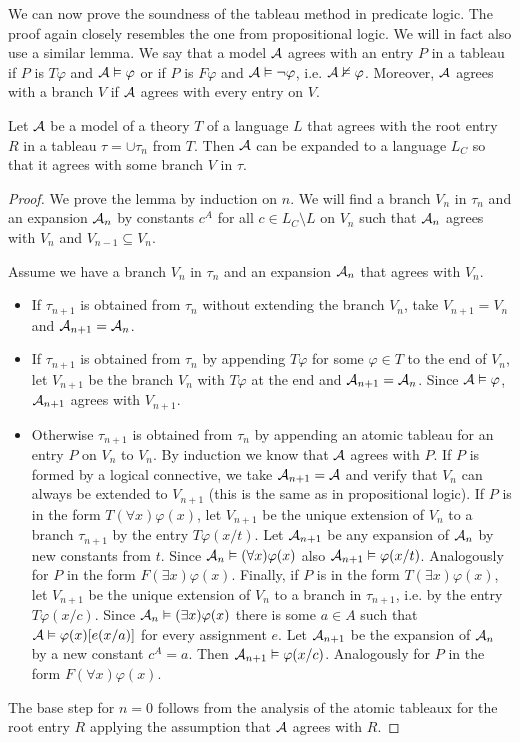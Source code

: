 We can now prove the soundness of the tableau method in predicate logic. The proof again closely resembles the one from propositional logic. We will in fact also use a similar lemma. We say that a model $\mathcal{A}$ agrees with an entry $P$ in a tableau if $P$ is $T \varphi$ and $\mathcal{A} \vDash \varphi$ or if $P$ is $F \varphi$ and $\mathcal{A} \vDash \neg \varphi$, i.e. $\mathcal{A} \nvDash \varphi$. Moreover, $\mathcal{A}$ agrees with a branch $V$ if $\mathcal{A}$ agrees with every entry on $V$.

\begin{lemma}
Let $\mathcal{A}$ be a model of a theory $T$ of a language $L$ that agrees with the root entry $R$ in a tableau $\tau = \cup \tau_n$ from $T$. Then $\mathcal{A}$ can be expanded to a language $L_C$ so that it agrees with some branch $V$ in $\tau$.
\end{lemma}
\begin{proof}
We prove the lemma by induction on $n$. We will find a branch $V_n$ in $\tau_n$ and an expansion $\mathcal{A}_n$ by constants $c^A$ for all $c \in L_C \setminus L$ on $V_n$ such that $\mathcal{A}_n$ agrees with $V_n$ and $V_{n-1} \subseteq V_{n}$.

Assume we have a branch $V_n$ in $\tau_n$ and an expansion $\mathcal{A}_n$ that agrees with $V_n$.
\begin{itemize}
	\item If $\tau_{n+1}$ is obtained from $\tau_n$ without extending the branch $V_n$, take $V_{n+1}=V_n$ and $\mathcal{A}_{n+1}=\mathcal{A}_n$.
	\item If $\tau_{n+1}$ is obtained from $\tau_n$ by appending $T \varphi$ for some $\varphi \in T$ to the end of $V_n$, let $V_{n+1}$ be the branch $V_n$ with $T \varphi$ at the end and $\mathcal{A}_{n+1} = \mathcal{A}_n$. Since $\mathcal{A} \vDash \varphi$, $\mathcal{A}_{n+1}$ agrees with $V_{n+1}$.
	\item Otherwise $\tau_{n+1}$ is obtained from $\tau_n$ by appending an atomic tableau for an entry $P$ on $V_n$ to $V_n$. By induction we know that $\mathcal{A}$ agrees with $P$. If $P$ is formed by a logical connective, we take $\mathcal{A}_{n+1}=\mathcal{A}$ and verify that $V_n$ can always be extended to $V_{n+1}$ (this is the same as in propositional logic). If $P$ is in the form $T(\forall x)\varphi(x)$, let $V_{n+1}$ be the unique extension of $V_n$ to a branch $\tau_{n+1}$ by the entry $T \varphi(x/t)$. Let $\mathcal{A}_{n+1}$ be any expansion of $\mathcal{A}_n$ by new constants from $t$. Since $\mathcal{A}_n \vDash (\forall x) \varphi(x)$ also $\mathcal{A}_{n+1} \vDash \varphi(x/t)$. Analogously for $P$ in the form $F(\exists x) \varphi(x)$. Finally, if $P$ is in the form $T(\exists x) \varphi(x)$, let $V_{n+1}$ be the unique extension of $V_n$ to a branch in $\tau_{n+1}$, i.e. by the entry $T \varphi(x/c)$. Since $\mathcal{A}_n \vDash (\exists x) \varphi(x)$ there is some $a \in A$ such that $\mathcal{A} \vDash \varphi(x)[e(x/a)]$ for every assignment $e$. Let $\mathcal{A}_{n+1}$ be the expansion of $\mathcal{A}_n$ by a new constant $c^A = a$. Then $\mathcal{A}_{n+1} \vDash \varphi(x/c)$. Analogously for $P$ in the form $F (\forall x)\varphi(x)$.
\end{itemize}
The base step for $n=0$ follows from the analysis of the atomic tableaux for the root entry $R$ applying the assumption that $\mathcal{A}$ agrees with $R$.
\end{proof}

